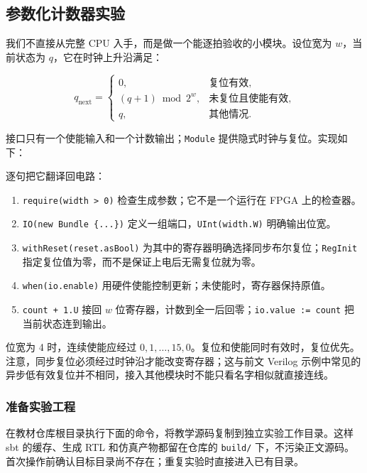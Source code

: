 \subsection{参数化计数器实验}
\label{sec:02-chisel-counter}

我们不直接从完整 CPU 入手，而是做一个能逐拍验收的小模块。设位宽为 $w$，当前状态为 $q$，它在时钟上升沿满足：

\begin{equation}
q_{\mathrm{next}} =
\begin{cases}
0, & \text{复位有效},\\
(q+1)\bmod 2^w, & \text{未复位且使能有效},\\
q, & \text{其他情况}.
\end{cases}
\label{eq:02-chisel-counter}
\end{equation}

接口只有一个使能输入和一个计数输出；\texttt{Module} 提供隐式时钟与复位。实现如下：


逐句把它翻译回电路：

\begin{enumerate}
  \item \texttt{require(width > 0)} 检查生成参数；它不是一个运行在 FPGA 上的检查器。
  \item \texttt{IO(new Bundle \{...\})} 定义一组端口，\texttt{UInt(width.W)} 明确输出位宽。
  \item \texttt{withReset(reset.asBool)} 为其中的寄存器明确选择同步布尔复位；\texttt{RegInit} 指定复位值为零，而不是保证上电后无需复位就为零。
  \item \texttt{when(io.enable)} 用硬件使能控制更新；未使能时，寄存器保持原值。
  \item \texttt{count + 1.U} 接回 $w$ 位寄存器，计数到全一后回零；\texttt{io.value := count} 把当前状态连到输出。
\end{enumerate}

位宽为 4 时，连续使能应经过 $0,1,\ldots,15,0$。复位和使能同时有效时，复位优先。注意，同步复位必须经过时钟沿才能改变寄存器；这与前文 Verilog 示例中常见的异步低有效复位并不相同，接入其他模块时不能只看名字相似就直接连线。

\subsubsection*{准备实验工程}

在教材仓库根目录执行下面的命令，将教学源码复制到独立实验工作目录。这样 sbt 的缓存、生成 RTL 和仿真产物都留在仓库的 \texttt{build/} 下，不污染正文源码。首次操作前确认目标目录尚不存在；重复实验时直接进入已有目录。

